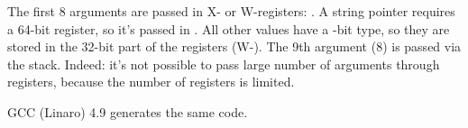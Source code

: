 


The first 8 arguments are passed in X- or W-registers: \cite{ARM64_PCS}.
A string pointer requires a 64-bit register, so it's passed in .
All other values have a -bit type, so they are stored in the 32-bit part of the registers (W-).
The 9th argument (8) is passed via the stack.
Indeed: it's not possible to pass large number of arguments through registers, because the number of registers is limited.

\Optimizing GCC (Linaro) 4.9 generates the same code.
